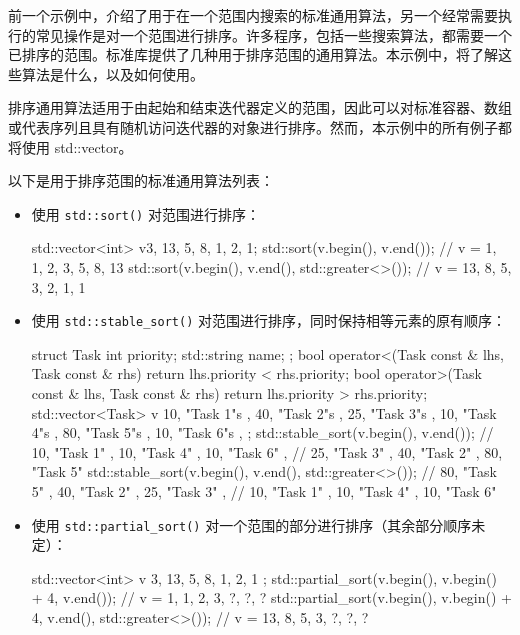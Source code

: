 前一个示例中，介绍了用于在一个范围内搜索的标准通用算法，另一个经常需要执行的常见操作是对一个范围进行排序。许多程序，包括一些搜索算法，都需要一个已排序的范围。标准库提供了几种用于排序范围的通用算法。本示例中，将了解这些算法是什么，以及如何使用。


排序通用算法适用于由起始和结束迭代器定义的范围，因此可以对标准容器、数组或代表序列且具有随机访问迭代器的对象进行排序。然而，本示例中的所有例子都将使用 std::vector。


以下是用于排序范围的标准通用算法列表：

\begin{itemize}
\item
使用 \verb|std::sort()| 对范围进行排序：

\begin{cpp}
std::vector<int> v{3, 13, 5, 8, 1, 2, 1};
std::sort(v.begin(), v.end());
// v = {1, 1, 2, 3, 5, 8, 13}
std::sort(v.begin(), v.end(), std::greater<>());
// v = {13, 8, 5, 3, 2, 1, 1}
\end{cpp}

\item
使用 \verb|std::stable_sort()| 对范围进行排序，同时保持相等元素的原有顺序：

\begin{cpp}
struct Task
{
    int priority;
    std::string name;
};
bool operator<(Task const & lhs, Task const & rhs) {
    return lhs.priority < rhs.priority;
}
bool operator>(Task const & lhs, Task const & rhs) {
    return lhs.priority > rhs.priority;
}
std::vector<Task> v{
    { 10, "Task 1"s }, { 40, "Task 2"s }, { 25, "Task 3"s },
    { 10, "Task 4"s }, { 80, "Task 5"s }, { 10, "Task 6"s },
};
std::stable_sort(v.begin(), v.end());
// {{ 10, "Task 1" },{ 10, "Task 4" },{ 10, "Task 6" },
    //  { 25, "Task 3" },{ 40, "Task 2" },{ 80, "Task 5" }}
std::stable_sort(v.begin(), v.end(), std::greater<>());
// {{ 80, "Task 5" },{ 40, "Task 2" },{ 25, "Task 3" },
    //  { 10, "Task 1" },{ 10, "Task 4" },{ 10, "Task 6" }}
\end{cpp}

\item
使用 \verb|std::partial_sort()| 对一个范围的部分进行排序（其余部分顺序未定）：

\begin{cpp}
std::vector<int> v{ 3, 13, 5, 8, 1, 2, 1 };
std::partial_sort(v.begin(), v.begin() + 4, v.end());
// v = {1, 1, 2, 3, ?, ?, ?}
std::partial_sort(v.begin(), v.begin() + 4, v.end(),
                  std::greater<>());
// v = {13, 8, 5, 3, ?, ?, ?}
\end{cpp}


\end{itemize}
